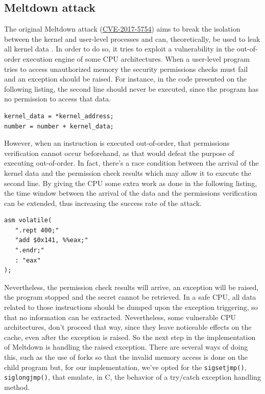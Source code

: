 \documentclass[conference]{IEEEtran}
\begin{document}
\subsection{Meltdown attack}
The original Meltdown attack (\href{https://nvd.nist.gov/vuln/detail/CVE-2017-5754}{CVE-2017-5754}) aims to break the isolation between the kernel and user-level processes and can, theoretically, be used to leak all kernel data \cite{meltdownPaper}. In order to do so, it tries to exploit a vulnerability in the out-of-order execution engine of some CPU architectures. When a user-level program tries to access unauthorized memory the security permissions checks must fail and an exception should be raised. For instance, in the code presented on the following listing, the second line should never be executed, since the program has no permission to access that data.
\begin{lstlisting}[style=CStyle, caption=Accessing kernel memory , label=code_snippet2]
kernel_data = *kernel_address;
number = number + kernel_data;
\end{lstlisting}
\par However, when an instruction is executed out-of-order, that permissions verification cannot occur beforehand, as that would defeat the purpose of executing out-of-order. In fact, there's a race condition between the arrival of the kernel data and the permission check results which may allow it to execute the second line. By giving the CPU some extra work as done in the following listing, the time window between the arrival of the data and the permissions verification can be extended, thus increasing the success rate of the attack.
\begin{lstlisting}[style=CStyle, caption=Assembly code that increases success rate , label=code_snippet2]
asm volatile(
   ".rept 400;"                
   "add $0x141, %%eax;"
   ".endr;"                    
   : "eax"
); 
\end{lstlisting}
\par Nevertheless, the permission check results will arrive, an exception will be raised, the program stopped and the secret cannot be retrieved. In a safe CPU, all data related to those instructions should be dumped upon the exception triggering, so that no information can be extracted. Nevertheless, some vulnerable CPU architectures, don't proceed that way, since they leave noticeable effects on the cache, even after the exception is raised. So the next step in the implementation of Meltdown is handling the raised exception. There are several ways of doing this, such as the use of forks so that the invalid memory access is done on the child program but, for our implementation, we've opted for the \texttt{sigsetjmp()}, \texttt{siglongjmp()}, that emulate, in C, the behavior of a try/catch exception handling method.
\end{document}
